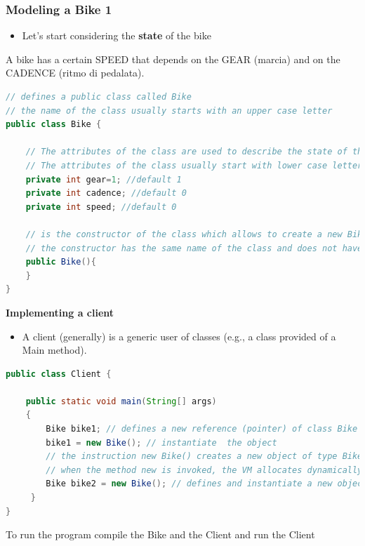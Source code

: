 \documentclass{article}
\theoremstyle{definition}
\begin{document}
\subsubsection{Modeling a Bike 1}
\begin{itemize}
\item Let's start considering the \textbf{state} of the bike
\end{itemize}
A bike has a certain SPEED that depends on the GEAR (marcia) and on the CADENCE (ritmo di pedalata).

\begin{lstlisting}[language=Java,escapechar=|]
// defines a public class called Bike 
// the name of the class usually starts with an upper case letter
public class Bike {
	
	// The attributes of the class are used to describe the state of the class and are usually private or protected 
	// The attributes of the class usually start with lower case letters
	private int gear=1; //default 1
	private int cadence; //default 0
	private int speed; //default 0
	
	// is the constructor of the class which allows to create a new Bike
	// the constructor has the same name of the class and does not have a return type
	public Bike(){
	}
}
\end{lstlisting}

\textbf{Implementing a client}
\begin{itemize}
\item A client (generally) is a generic user of classes (e.g., a class provided of a Main method).
\end{itemize}

\begin{lstlisting}[language=Java,escapechar=|]
public class Client {
	
	public static void main(String[] args)
    {
        Bike bike1; // defines a new reference (pointer) of class Bike with a predefined value null
        bike1 = new Bike(); // instantiate  the object
        // the instruction new Bike() creates a new object of type Bike and returns the reference to this object which is assigned to the reference bike1
        // when the method new is invoked, the VM allocates dynamically the quantity of memory which is sufficient to contain the Bike object
        Bike bike2 = new Bike(); // defines and instantiate a new object of class Bike
     }
}
\end{lstlisting}
To run the program compile the Bike and the Client and run the Client
\end{document}

